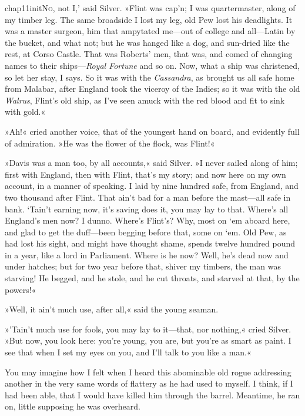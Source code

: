 
\lettrine[ante=`,lines=4,image=true]{chap11initN}{o}, not I,' said Silver. »Flint was cap'n; I was quartermaster, along of my timber leg. The same broadside I lost my leg, old Pew lost his deadlights. It was a master surgeon, him that ampytated me—out of college and all—Latin by the bucket, and what not; but he was hanged like a dog, and sun-dried like the rest, at Corso Castle. That was Roberts' men, that was, and comed of changing names to their ships—\textit{Royal Fortune} and so on. Now, what a ship was christened, so let her stay, I says. So it was with the \textit{Cassandra}, as brought us all safe home from Malabar, after England took the viceroy of the Indies; so it was with the old \textit{\textit{Walrus}}, Flint's old ship, as I've seen amuck with the red blood and fit to sink with gold.«

»Ah!« cried another voice, that of the youngest hand on board, and evidently full of admiration. »He was the flower of the flock, was Flint!«

»Davis was a man too, by all accounts,« said Silver. »I never sailed along of him; first with England, then with Flint, that's my story; and now here on my own account, in a manner of speaking. I laid by nine hundred safe, from England, and two thousand after Flint. That ain't bad for a man before the mast—all safe in bank. `Tain't earning now, it's saving does it, you may lay to that. Where's all England's men now? I dunno. Where's Flint's? Why, most on `em aboard here, and glad to get the duff—been begging before that, some on `em. Old Pew, as had lost his sight, and might have thought shame, spends twelve hundred pound in a year, like a lord in Parliament. Where is he now? Well, he's dead now and under hatches; but for two year before that, shiver my timbers, the man was starving! He begged, and he stole, and he cut throats, and starved at that, by the powers!«

»Well, it ain't much use, after all,« said the young seaman.

»'Tain't much use for fools, you may lay to it—that, nor nothing,« cried Silver. »But now, you look here: you're young, you are, but you're as smart as paint. I see that when I set my eyes on you, and I'll talk to you like a man.«

You may imagine how I felt when I heard this abominable old rogue addressing another in the very same words of flattery as he had used to myself. I think, if I had been able, that I would have killed him through the barrel. Meantime, he ran on, little supposing he was overheard.

